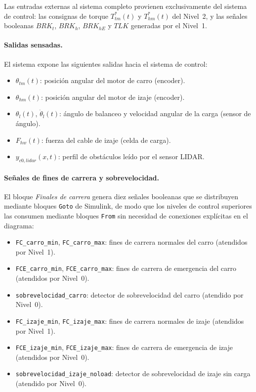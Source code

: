 \documentclass[12pt, a4paper]{article}
\begin{document}
Las entradas externas al sistema completo provienen exclusivamente del sistema de
control: las consignas de torque $T_{tm}^*(t)$ y $T_{hm}^*(t)$ del Nivel~2, y las
señales booleanas $BRK_t$, $BRK_h$, $BRK_{hE}$ y $TLK$ generadas por el Nivel~1.

\paragraph{Salidas sensadas.}

El sistema expone las siguientes salidas hacia el sistema de control:
\begin{itemize}
    \item $\theta_{tm}(t)$: posición angular del motor de carro (encoder).
    \item $\theta_{hm}(t)$: posición angular del motor de izaje (encoder).
    \item $\theta_l(t)$, $\dot{\theta}_l(t)$: ángulo de balanceo y velocidad angular
    de la carga (sensor de ángulo).
    \item $F_{hw}(t)$: fuerza del cable de izaje (celda de carga).
    \item $y_{c0,lidar}(x,t)$: perfil de obstáculos leído por el sensor LIDAR.
\end{itemize}

\paragraph{Señales de fines de carrera y sobrevelocidad.}

El bloque \textit{Finales de carrera} genera diez señales booleanas que se distribuyen
mediante bloques \texttt{Goto} de Simulink, de modo que los niveles de control
superiores las consumen mediante bloques \texttt{From} sin necesidad de conexiones
explícitas en el diagrama:

\begin{itemize}
    \item \texttt{FC\_carro\_min}, \texttt{FC\_carro\_max}: fines de carrera normales
    del carro (atendidos por Nivel~1).
    \item \texttt{FCE\_carro\_min}, \texttt{FCE\_carro\_max}: fines de carrera de
    emergencia del carro (atendidos por Nivel~0).
    \item \texttt{sobrevelocidad\_carro}: detector de sobrevelocidad del carro
    (atendido por Nivel~0).
    \item \texttt{FC\_izaje\_min}, \texttt{FC\_izaje\_max}: fines de carrera normales
    de izaje (atendidos por Nivel~1).
    \item \texttt{FCE\_izaje\_min}, \texttt{FCE\_izaje\_max}: fines de carrera de
    emergencia de izaje (atendidos por Nivel~0).
    \item \texttt{sobrevelocidad\_izaje\_noload}: detector de sobrevelocidad de izaje
    sin carga (atendido por Nivel~0).
\end{itemize}
\end{document}
